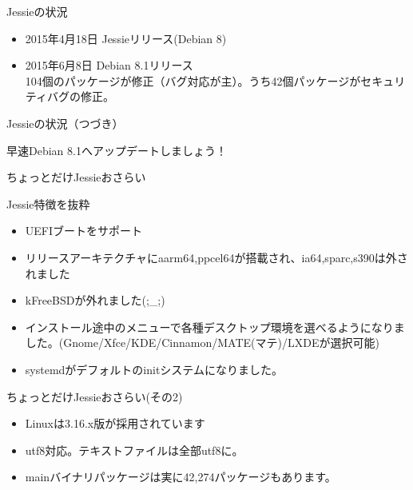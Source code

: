 \begin{frame}{Jessieの状況}
  
\begin{itemize}
\item 2015年4月18日 Jessieリリース(Debian 8)
\item 2015年6月8日 Debian 8.1リリース\\
      104個のパッケージが修正（バグ対応が主）。うち42個パッケージがセキュリティバグの修正。
\end{itemize}

\end{frame}

\begin{frame}{Jessieの状況（つづき）}
  
  \begin{center}
    \LARGE 早速Debian 8.1へアップデートしましょう！
  \end{center}
  
\end{frame}

\begin{frame}{ちょっとだけJessieおさらい}

 Jessie特徴を抜粋

 \begin{itemize} 
 \item UEFIブートをサポート
 \item リリースアーキテクチャにaarm64,ppcel64が搭載され、ia64,sparc,s390は外されました
 \item kFreeBSDが外れました(;\_;)
 \item インストール途中のメニューで各種デスクトップ環境を選べるようになりました。(Gnome/Xfce/KDE/Cinnamon/MATE(マテ)/LXDEが選択可能)
 \item systemdがデフォルトのinitシステムになりました。
 \end{itemize}

\end{frame}

\begin{frame}{ちょっとだけJessieおさらい(その2)}

 \begin{itemize} 
 \item Linuxは3.16.x版が採用されています
 \item utf8対応。テキストファイルは全部utf8に。
 \item mainバイナリパッケージは実に42,274パッケージもあります。
 \end{itemize}

\end{frame}

